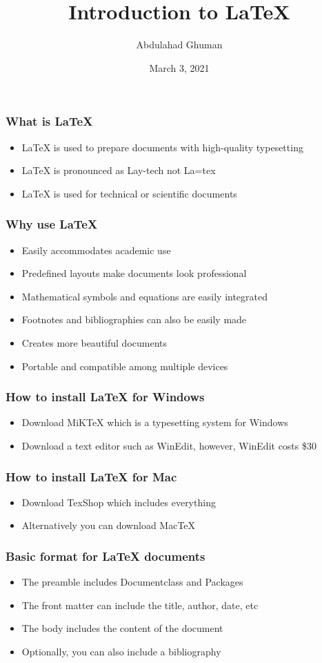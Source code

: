 \documentclass{beamer}
\title{Introduction to LaTeX}
\author{Abdulahad Ghuman}
\date{March 3, 2021}
\begin{document}
\maketitle

\begin{frame}
\frametitle{What is LaTeX}
\begin{itemize}
\item LaTeX is used to prepare documents with high-quality typesetting
\item LaTeX is pronounced as Lay-tech not La=tex
\item LaTeX is used for technical or scientific documents
\end{itemize}
\end{frame}

\begin{frame}
\frametitle{Why use LaTeX}
\begin{itemize}
\item Easily accommodates academic use
\item Predefined layouts make documents look professional
\item Mathematical symbols and equations are easily integrated
\item Footnotes and bibliographies can also be easily made
\item Creates more beautiful documents
\item Portable and compatible among multiple devices
\end{itemize}
\end{frame}

\begin{frame}
\frametitle{How to install LaTeX for Windows}
\begin{itemize}
\item Download MiKTeX which is a typesetting system for Windows
\item Download a text editor such as WinEdit, however, WinEdit costs \$30
\end{itemize}
\end{frame}

\begin{frame}
\frametitle{How to install LaTeX for Mac}
\begin{itemize}
\item Download TexShop which includes everything
\item Alternatively you can download MacTeX
\end{itemize}
\end{frame}

\begin{frame}
\frametitle{Basic format for LaTeX documents}
\begin{itemize}
\item The preamble includes Documentclass and Packages
\item The front matter can include the title, author, date, etc
\item The body includes the content of the document
\item Optionally, you can also include a bibliography
\end{itemize}
\end{frame}
\end{document}
